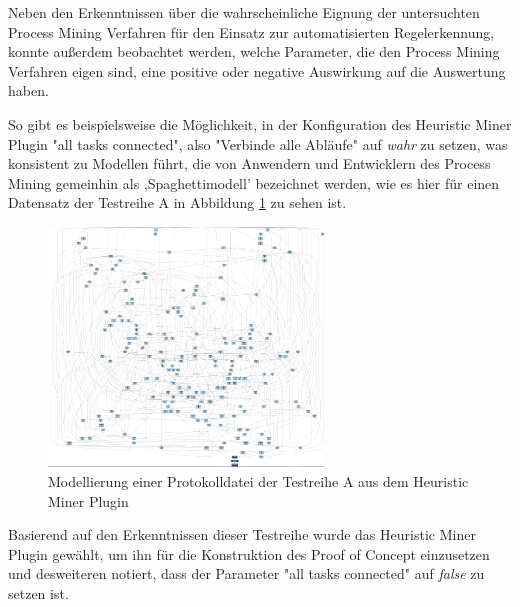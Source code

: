 Neben den Erkenntnissen über die wahrscheinliche Eignung der untersuchten Process Mining Verfahren für den Einsatz zur automatisierten Regelerkennung, konnte außerdem beobachtet werden, welche Parameter, die den Process Mining Verfahren eigen sind, eine positive oder negative Auswirkung auf die Auswertung haben. 

So gibt es beispielsweise die Möglichkeit, in der Konfiguration des Heuristic Miner Plugin "all tasks connected", also "Verbinde alle Abläufe" auf \textit{wahr} zu setzen, was konsistent zu Modellen führt, die von Anwendern und Entwicklern des Process Mining gemeinhin als ,Spaghettimodell' bezeichnet werden, wie es hier für einen Datensatz der Testreihe A in Abbildung \ref{fig:A_heuristic_spagh} zu sehen ist.
\begin{figure}[!ht]
    \centering
    \includegraphics[width=0.65\textwidth,]{figures/Appbildungen/A_underfitted.PNG}
    \caption{Modellierung einer Protokolldatei der Testreihe A aus dem Heuristic Miner Plugin}
    \label{fig:A_heuristic_spagh}
\end{figure}

Basierend auf den Erkenntnissen dieser Testreihe wurde das Heuristic Miner Plugin gewählt, um ihn für die Konstruktion des Proof of Concept einzusetzen und desweiteren notiert, dass der Parameter "all tasks connected" auf \textit{false} zu setzen ist.





